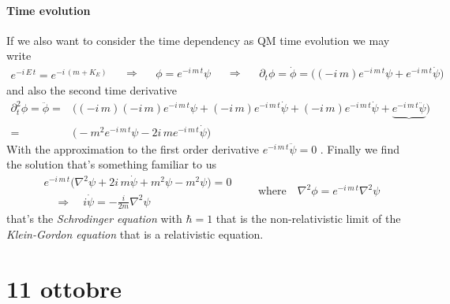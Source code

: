 \documentclass[class=article]{standalone}
\begin{document}
\paragraph{Time evolution} If we also want to consider the time dependency as QM time evolution we may write 
\begin{equation*}
\begin{split}
e^{- i \,E \, t} = e^{- i \, (m + K_E)} 
\end{split}\quad\Rightarrow\quad
\begin{split}
\phi = e^{- i \, m \, t} \psi
\end{split}\quad\Rightarrow\quad
\begin{split}
\partial_t \phi = \dot \phi = \Big(   (-i\,m) e^{- i \, m \, t} \psi + e^{- i \, m \, t} \dot \psi   \Big) 
\end{split}
\end{equation*}
and also the second time derivative
\begin{equation*}
\begin{split}
\partial^2_t \phi =  \ddot \phi = &  \Big(   (-i\,m)  (-i\,m) e^{- i \, m \, t} \psi +  (-i\,m) e^{- i \, m \, t} \dot \psi +  (-i\,m) e^{- i \, m \, t} \dot \psi 
+ \underbrace{e^{- i \, m \, t} \ddot \psi }  \Big) \\
= & \Big(  -m^2 e^{- i \, m \, t} \psi  - 2 i\,m e^{- i \, m \, t} \dot \psi   \Big) 
\end{split}
\end{equation*}
With the approximation to the first order derivative $ e^{- i \, m \, t} \ddot \psi = 0 $ .
Finally we find the solution that's something familiar to us
\begin{equation*}
\begin{split}
& e^{- i \, m \, t} \Big(  \nabla^2 \psi + 2 i\,m \dot \psi + m^2 \psi - m^2 \psi  \Big) = 0 \\
& \quad\Rightarrow\quad i \dot \psi  = - \frac{i}{2m} \nabla^2 \psi
\end{split}
\quad\quad \mbox{where} \quad \nabla^2 \phi = e^{- i \, m \, t} \nabla^2 \psi 
\end{equation*}
that's the \emph{Schrodinger equation} with $\hbar = 1$ that is the non-relativistic limit of the \emph{Klein-Gordon equation} that is a relativistic equation.





\newpage
\section{11 ottobre}
\end{document}
